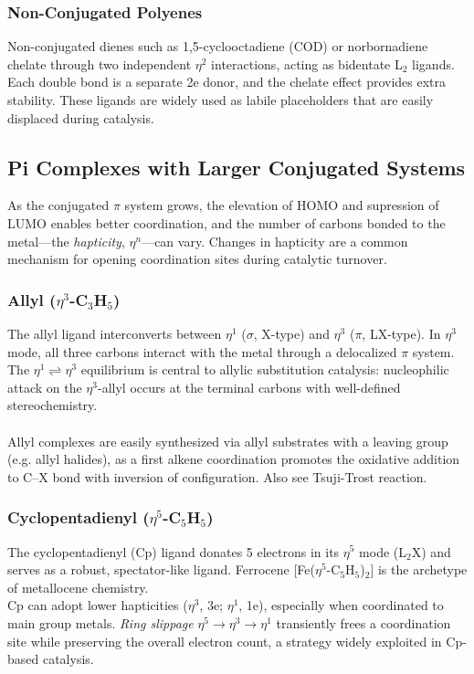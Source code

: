 \subsubsection{Non-Conjugated Polyenes}
%
Non-conjugated dienes such as 1,5-cyclooctadiene (COD) or norbornadiene
chelate through two independent $\eta^2$ interactions, acting as bidentate L$_2$ ligands.
Each double bond is a separate 2e donor, and the chelate effect provides extra stability.
These ligands are widely used as labile placeholders that are easily displaced during catalysis.
%
\subsection{Pi Complexes with Larger Conjugated Systems}
%
As the conjugated $\pi$ system grows, the elevation of HOMO and supression of LUMO enables better coordination, and
the number of carbons bonded to the metal---the \emph{hapticity}, $\eta^n$---can vary.
Changes in hapticity are a common mechanism for opening coordination sites during catalytic turnover.
%
\subsubsection{Allyl ($\eta^3$-C$_3$H$_5$)}
%
The allyl ligand interconverts between $\eta^1$ ($\sigma$, X-type) and $\eta^3$ ($\pi$, LX-type).
In $\eta^3$ mode, all three carbons interact with the metal through a delocalized $\pi$ system.
The $\eta^1 \rightleftharpoons \eta^3$ equilibrium is central to allylic substitution catalysis:
nucleophilic attack on the $\eta^3$-allyl occurs at the terminal carbons with well-defined stereochemistry.\\ \\
%
Allyl complexes are easily synthesized via allyl substrates with a leaving group (e.g. allyl halides),
as a first alkene coordination promotes the oxidative addition to C--X bond with inversion of configuration.
Also see Tsuji-Trost reaction.
%
\subsubsection{Cyclopentadienyl ($\eta^5$-C$_5$H$_5$)}
%
The cyclopentadienyl (Cp) ligand donates 5 electrons in its $\eta^5$ mode (L$_2$X)
and serves as a robust, spectator-like ligand.
Ferrocene [Fe($\eta^5$-C$_5$H$_5$)$_2$] is the archetype of metallocene chemistry.\\
%
Cp can adopt lower hapticities ($\eta^3$, 3e; $\eta^1$, 1e), especially when coordinated to main group metals.
\emph{Ring slippage} $\eta^5 \to \eta^3 \to \eta^1$ transiently frees a coordination site
while preserving the overall electron count,
a strategy widely exploited in Cp-based catalysis.
%
